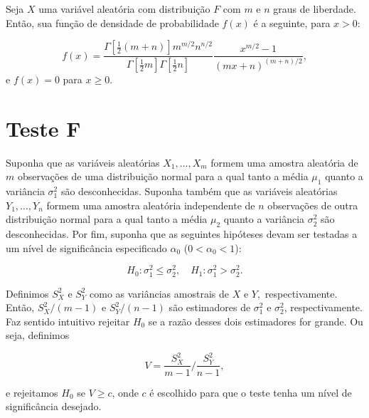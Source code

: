 \documentclass[12pt]{beamer}
\begin{document}
\begin{frame}{}
\begin{block}{}
\justifying
Seja $X$ uma variável aleatória com distribuição $F$ com $m$ e $n$ graus de liberdade. Então, sua função de densidade de probabilidade $f(x)$ é a seguinte, para $x > 0:$

\[
f(x) = \dfrac{\Gamma\left[\frac{1}{2}(m+n)\right]m^{m/2}n^{n/2}}{\Gamma\left[\frac{1}{2}m\right]\Gamma\left[\frac{1}{2}n\right]}\dfrac{x^{m/2}-1}{(mx+n)^{(m+n)/2}},
\]
e $f(x) = 0$ para $x \geq 0.$

\end{block}
\end{frame}

\section{Teste F}
\begin{frame}{}
\begin{block}{}
\justifying
Suponha que as variáveis aleatórias $X_1, \ldots, X_m$ formem uma amostra aleatória de $m$ observações de uma distribuição normal para a qual tanto a média $\mu_1$ quanto a variância $\sigma^2_1$ são desconhecidas. Suponha também que as variáveis aleatórias $Y_1, \ldots, Y_n$ formem uma amostra aleatória independente de $n$ observações de outra distribuição normal para a qual tanto a média $\mu_2$ quanto a variância $\sigma^2_2$ são desconhecidas. Por fim, suponha que as seguintes hipóteses devam ser testadas a um nível de significância especificado $\alpha_0$ ($0 < \alpha_0 < 1$):

\[
H_0: \sigma^2_1 \leq \sigma^2_2, \quad H_1: \sigma^2_1 > \sigma^2_2.
\]
\end{block}
\end{frame}

\begin{frame}{}
\begin{block}{}
\justifying
Definimos $S^2_X$ e $S^2_Y$ como as variâncias amostrais de $X$ e $Y,$ respectivamente. Então, $S^2_X / (m - 1)$ e $S^2_Y / (n - 1)$ são estimadores de $\sigma^2_1$ e $\sigma^2_2$, respectivamente. Faz sentido intuitivo rejeitar $H_0$ se a razão desses dois estimadores for grande. Ou seja, definimos

\[
V = \frac{S^2_X}{m - 1} \bigg/ \frac{S^2_Y}{n - 1},
\]

e rejeitamos $H_0$ se $V \geq c$, onde $c$ é escolhido para que o teste tenha um nível de significância desejado.

\end{block}
\end{frame}
\end{document}
